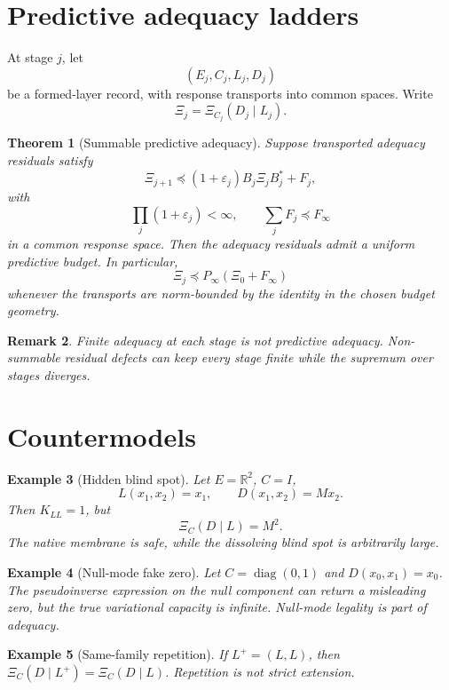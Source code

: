 \documentclass[11pt]{article}
\newtheorem{theorem}{Theorem}[section]
\newtheorem{remark}[theorem]{Remark}
\newtheorem{example}[theorem]{Example}
\begin{document}
\section{Predictive adequacy ladders}

At stage \(j\), let
\[
(E_j,C_j,L_j,D_j)
\]
be a formed-layer record, with response transports into common spaces.  Write
\[
\Xi_j=\Xi_{C_j}(D_j\mid L_j).
\]

\begin{theorem}[Summable predictive adequacy]
Suppose transported adequacy residuals satisfy
\[
\Xi_{j+1}\preceq (1+\varepsilon_j)B_j\Xi_jB_j^*+F_j,
\]
with
\[
\prod_j(1+\varepsilon_j)<\infty,
\qquad
\sum_jF_j\preceq F_\infty
\]
in a common response space.  Then the adequacy residuals admit a uniform predictive budget.  In particular,
\[
\Xi_j\preceq P_\infty(\Xi_0+F_\infty)
\]
whenever the transports are norm-bounded by the identity in the chosen budget geometry.
\end{theorem}

\begin{remark}
Finite adequacy at each stage is not predictive adequacy.  Non-summable residual defects can keep every stage finite while the supremum over stages diverges.
\end{remark}

\section{Countermodels}

\begin{example}[Hidden blind spot]
Let \(E=\mathbb R^2\), \(C=I\),
\[
L(x_1,x_2)=x_1,
\qquad
D(x_1,x_2)=Mx_2.
\]
Then \(K_{LL}=1\), but
\[
\Xi_C(D\mid L)=M^2.
\]
The native membrane is safe, while the dissolving blind spot is arbitrarily large.
\end{example}

\begin{example}[Null-mode fake zero]
Let \(C=\operatorname{diag}(0,1)\) and \(D(x_0,x_1)=x_0\).  The pseudoinverse expression on the null component can return a misleading zero, but the true variational capacity is infinite.  Null-mode legality is part of adequacy.
\end{example}

\begin{example}[Same-family repetition]
If \(L^+=(L,L)\), then \(\Xi_C(D\mid L^+)=\Xi_C(D\mid L)\).  Repetition is not strict extension.
\end{example}
\end{document}
